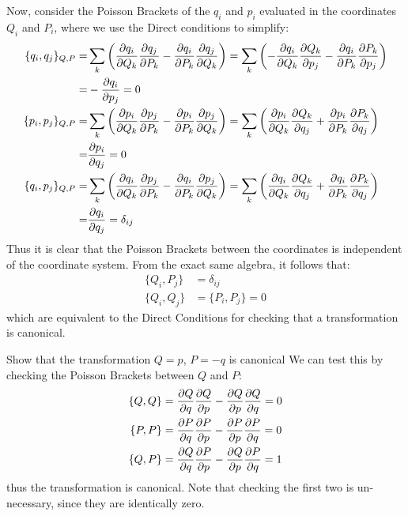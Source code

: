 Now, consider the Poisson Brackets of the $q_i$ and $p_i$ evaluated in the coordinates $Q_i$ and $P_i$, where we use the Direct conditions to simplify:
\begin{align}
\{q_i,q_j\}_{Q,P}=&\sum_k\left(\frac{\partial q_i}{\partial Q_k}\frac{\partial q_j}{\partial P_k}-\frac{\partial q_i}{\partial P_k}\frac{\partial q_j}{\partial Q_k}\right)=\sum_k\left(-\frac{\partial q_i}{\partial Q_k}\frac{\partial Q_k}{\partial p_j}-\frac{\partial q_i}{\partial P_k}\frac{\partial P_k}{\partial p_j}\right)\nonumber\\
=&-\frac{\partial q_i}{\partial p_j}=0\nonumber\\
\{p_i,p_j\}_{Q,P}=&\sum_k\left(\frac{\partial p_i}{\partial Q_k}\frac{\partial p_j}{\partial P_k}-\frac{\partial p_i}{\partial P_k}\frac{\partial p_j}{\partial Q_k}\right) =\sum_k\left(\frac{\partial p_i}{\partial Q_k}\frac{\partial Q_k}{\partial q_j}+\frac{\partial p_i}{\partial P_k}\frac{\partial P_k}{\partial q_j}\right)\nonumber\\
=&\frac{\partial p_i}{\partial q_j}=0\nonumber\\
\{q_i,p_j\}_{Q,P}=&\sum_k\left(\frac{\partial q_i}{\partial Q_k}\frac{\partial p_j}{\partial P_k}-\frac{\partial q_i}{\partial P_k}\frac{\partial p_j}{\partial Q_k}\right)
=\sum_k\left(\frac{\partial q_i}{\partial Q_k}\frac{\partial Q_k}{\partial q_j}+\frac{\partial q_i}{\partial P_k}\frac{\partial P_k}{\partial q_j}\right)\nonumber\\
=&\frac{\partial q_i}{\partial q_j}=\delta_{ij}
\end{align}
Thus it is clear that the Poisson Brackets between the coordinates is independent of the coordinate system. From the exact same algebra, it follows that:
\begin{align}
\{Q_i,P_j\}&=\delta_{ij}\nonumber\\
\{Q_i,Q_j\}&=\{P_i,P_j\}=0
\end{align}
which are equivalent to the Direct Conditions for checking that a transformation is canonical.
\begin{example}{0pt}{Show that the transformation $Q=p$, $P=-q$ is canonical}{}
We can test this by checking the Poisson Brackets between $Q$ and $P$:
\begin{align*}
\{Q,Q\}&=\frac{\partial Q}{\partial q}\frac{\partial Q}{\partial p}-\frac{\partial Q}{\partial p}\frac{\partial Q}{\partial q}=0\nonumber\\
\{P,P\}&=\frac{\partial P}{\partial q}\frac{\partial P}{\partial p}-\frac{\partial P}{\partial p}\frac{\partial P}{\partial q}=0\nonumber\\
\{Q,P\}&=\frac{\partial Q}{\partial q}\frac{\partial P}{\partial p}-\frac{\partial Q}{\partial p}\frac{\partial P}{\partial q}=1
\end{align*}
thus the transformation is canonical. Note that checking the first two is un-necessary, since they are identically zero.
\end{example}

